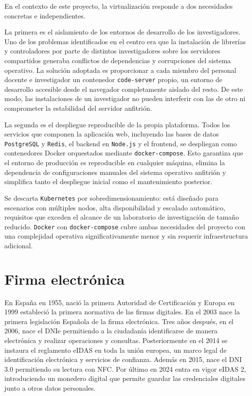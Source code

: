 En el contexto de este proyecto, la virtualización responde a dos necesidades
concretas e independientes.

La primera es el aislamiento de los entornos de desarrollo de los
investigadores. Uno de los problemas identificados en el centro era que la
instalación de librerías y controladores por parte de distintos investigadores
sobre los servidores compartidos generaba conflictos de dependencias y
corrupciones del sistema operativo. La solución adoptada es proporcionar a
cada miembro del personal docente e investigador un contenedor
\texttt{code-server} propio, un entorno de desarrollo accesible desde el
navegador completamente aislado del resto. De este modo, las instalaciones
de un investigador no pueden interferir con las de otro ni comprometer la
estabilidad del servidor anfitrión.

La segunda es el despliegue reproducible de la propia plataforma.
Todos los servicios que componen la aplicación web, incluyendo las bases de
datos \texttt{PostgreSQL} y \texttt{Redis}, el backend en \texttt{Node.js}
y el frontend, se despliegan como contenedores Docker orquestados mediante
\texttt{docker-compose}. Esto garantiza que el entorno de producción es
reproducible en cualquier máquina, elimina la dependencia de configuraciones
manuales del sistema operativo anfitrión y simplifica tanto el despliegue
inicial como el mantenimiento posterior.

Se descarta \texttt{Kubernetes} por sobredimensionamiento: está diseñado
para escenarios con múltiples nodos, alta disponibilidad y escalado
automático, requisitos que exceden el alcance de un laboratorio de
investigación de tamaño reducido. \texttt{Docker} con
\texttt{docker-compose} cubre ambas necesidades del proyecto con una
complejidad operativa significativamente menor y sin requerir infraestructura
adicional.


\section{Firma electrónica}


En España en 1955, nació la primera Autoridad de Certificación y Europa en 1999 estableció la primera normativa de las firmas digitales. En el 2003 nace la primera legislación Española de la firma electrónica. Tres años después, en el 2006, nace el DNIe permitiendo a la ciudadanía identificarse de manera electrónica y realizar operaciones y consultas. Posteriormente en el 2014 se instaura el reglamento eIDAS en toda la unión europea, un marco legal de identificación electrónica y servicios de confianza. Además en 2015, nace el DNI 3.0 permitiendo su lectura con NFC. Por último en 2024 entra en vigor eIDAS 2, introduciendo un monedero digital que permite guardar las credenciales digitales junto a otros datos personales. \cite{viafirma_evolucion_firma}

